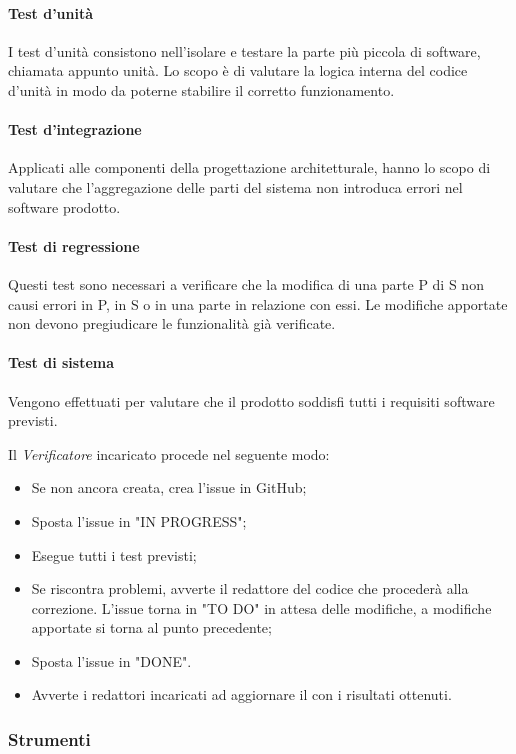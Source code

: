 \paragraph*{Test d'unità}
I test d'unità consistono nell'isolare e testare la parte più piccola di software, chiamata appunto unità. Lo scopo è di valutare la logica interna del codice d'unità in modo da poterne stabilire il corretto funzionamento. 
\paragraph*{Test d'integrazione}
Applicati alle componenti della progettazione architetturale, hanno lo scopo di valutare che l'aggregazione delle parti del sistema non introduca errori nel software prodotto.
\paragraph*{Test di regressione}
Questi test sono necessari a verificare che la modifica di una parte P di S non causi errori in P, in S o in una parte in relazione con essi. Le modifiche apportate non devono pregiudicare le funzionalità già verificate. 
\paragraph*{Test di sistema}
Vengono effettuati per valutare che il prodotto soddisfi tutti i requisiti software previsti.

\label{ProceduraVerifica}
Il \textit{Verificatore} incaricato procede nel seguente modo:
\begin{itemize}
	\item Se non ancora creata, crea l'issue in GitHub;
	\item Sposta l'issue in "IN PROGRESS";
	\item Esegue tutti i test previsti;
	\item Se riscontra problemi, avverte il redattore del codice che procederà alla correzione. L'issue torna in "TO DO" in attesa delle modifiche, a modifiche apportate si torna al punto precedente;
	\item Sposta l'issue in "DONE".
	\item Avverte i redattori incaricati ad aggiornare il \PdQv{} con i risultati ottenuti.
\end{itemize}


\subsubsection{Strumenti}
